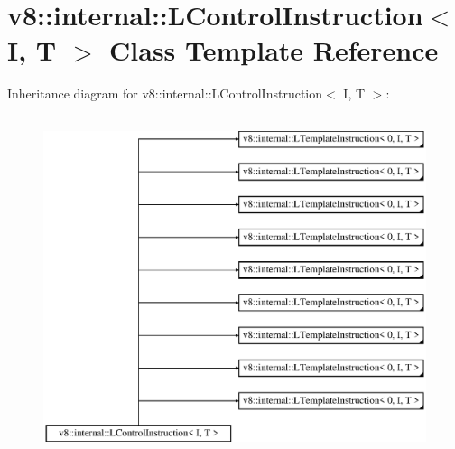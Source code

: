 \hypertarget{classv8_1_1internal_1_1_l_control_instruction}{}\section{v8\+:\+:internal\+:\+:L\+Control\+Instruction$<$ I, T $>$ Class Template Reference}
\label{classv8_1_1internal_1_1_l_control_instruction}
Inheritance diagram for v8\+:\+:internal\+:\+:L\+Control\+Instruction$<$ I, T $>$\+:\begin{figure}[H]
\begin{center}
\leavevmode
\includegraphics[height=10.000000cm]{classv8_1_1internal_1_1_l_control_instruction}
\end{center}
\end{figure}
